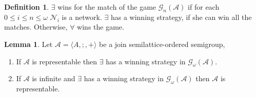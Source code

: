 \documentclass[a4paper]{article}
\theoremstyle{definition}
\newtheorem{definition}{Definition}
\theoremstyle{theorem}
\theoremstyle{proposition}
\theoremstyle{lemma}
\newtheorem{lemma}{Lemma}
\theoremstyle{ex}
\theoremstyle{corollary}
\theoremstyle{claim}
\begin{document}
\begin{definition}
  $\exists$ wins for the match of the game $\mathcal{G}_n(\mathcal{A})$ if for each $0 \leq i \leq n \leq \omega$ $\mathcal{N}_i$ is a network. $\exists$ has a winning strategy, if she can win all the matches. Otherwise, $\forall$ wins the game.
\end{definition}

\begin{lemma} Let $\mathcal{A} = \langle A, ;, + \rangle$ be a join semilattice-ordered semigroup,

  \begin{enumerate}
    \item If $\mathcal{A}$ is representable then $\exists$ has a winning strategy in $\mathcal{G}_{\omega}(\mathcal{A})$.
    \item If $\mathcal{A}$ is infinite and $\exists$ has a winning strategy in $\mathcal{G}_{\omega}(\mathcal{A})$ then $\mathcal{A}$ is representable.
  \end{enumerate}
\end{lemma}
\end{document}
